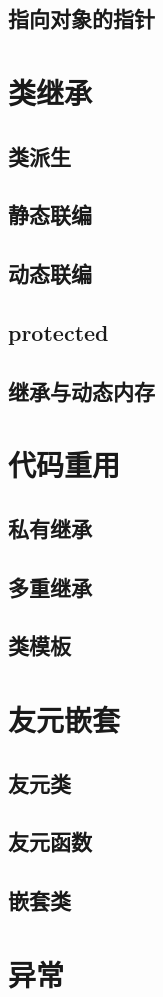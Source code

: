 \documentclass[UTF8,a4paper,12pt]{article}
\begin{document}
\subsection{指向对象的指针}
\newpage
\section{类继承}
\subsection{类派生}
\subsection{静态联编}
\subsection{动态联编}
\subsection{protected}
\subsection{继承与动态内存}
\newpage
\section{代码重用}
\subsection{私有继承}
\subsection{多重继承}
\subsection{类模板}
\newpage
\section{友元嵌套}
\subsection{友元类}
\subsection{友元函数}
\subsection{嵌套类}
\newpage
\section{异常}
\end{document}
